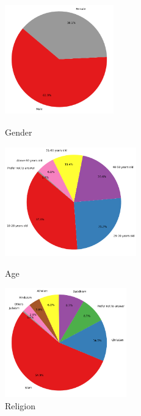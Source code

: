 \documentclass[pt]{article}  %
\begin{document}
\begin{figure}[H]
    \centering
    \begin{minipage}[b]{0.3\textwidth} %
        \centering
        \includegraphics[width=4.7cm, height=4.8cm]{gender-Distribution.png} %
        \caption{Gender} %
        \label{fig:gender-Distribution} %
    \end{minipage}
    \hfill
    \hspace*{-1cm}
    \begin{minipage}[b]{0.3\textwidth} %
        \centering
        \includegraphics[width=5.7cm]{Age_Distribution.png} %
        \caption{Age} %
        \label{fig:Age_Distribution} %
    \end{minipage}
    \hfill
    \begin{minipage}[b]{0.3\textwidth} %
        \centering
        \includegraphics[width=5.18 cm, height=4.7cm] {religion-Distribution} %
        \caption{Religion} %
        \label{fig:religion-Distribution} %
    \end{minipage}
\end{figure}
\end{document}
